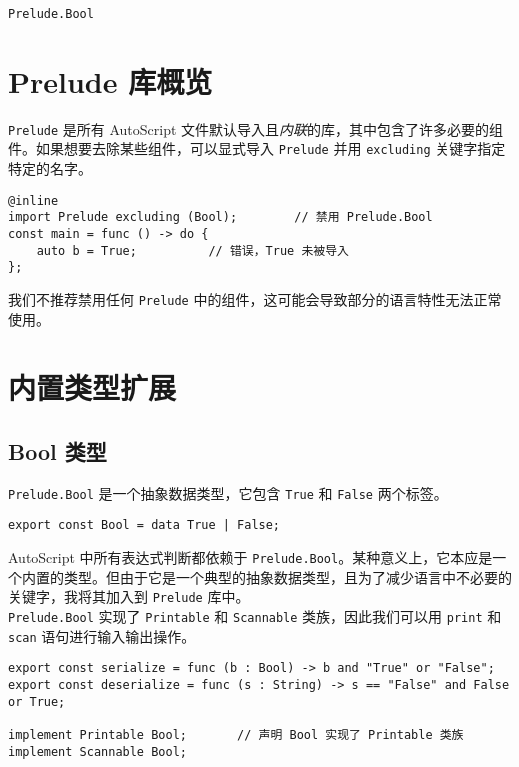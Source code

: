 \begin{introduction}
    \item \lstinline!Prelude.Bool!
\end{introduction}

\section{Prelude 库概览}

\lstinline!Prelude! 是所有 AutoScript 文件默认导入且\emph{内联}的库，其中包含了许多必要的组件。如果想要去除某些组件，可以显式导入 \lstinline!Prelude! 并用 \lstinline!excluding! 关键字指定特定的名字。

\begin{lstlisting}
@inline
import Prelude excluding (Bool);        // 禁用 Prelude.Bool
const main = func () -> do {
    auto b = True;          // 错误，True 未被导入
};
\end{lstlisting}

我们不推荐禁用任何 \lstinline!Prelude! 中的组件，这可能会导致部分的语言特性无法正常使用。

\section{内置类型扩展}

\subsection{Bool 类型}

\lstinline!Prelude.Bool! 是一个抽象数据类型，它包含 \lstinline!True! 和 \lstinline!False! 两个标签。

\begin{lstlisting}
export const Bool = data True | False;
\end{lstlisting}

AutoScript 中所有表达式判断都依赖于 \lstinline!Prelude.Bool!。某种意义上，它本应是一个内置的类型。但由于它是一个典型的抽象数据类型，且为了减少语言中不必要的关键字，我将其加入到 \lstinline!Prelude! 库中。 \\

\lstinline!Prelude.Bool! 实现了 \lstinline!Printable! 和 \lstinline!Scannable! 类族，因此我们可以用 \lstinline!print! 和 \lstinline!scan! 语句进行输入输出操作。

\begin{lstlisting}
export const serialize = func (b : Bool) -> b and "True" or "False";
export const deserialize = func (s : String) -> s == "False" and False or True;

implement Printable Bool;		// 声明 Bool 实现了 Printable 类族
implement Scannable Bool;
\end{lstlisting}

